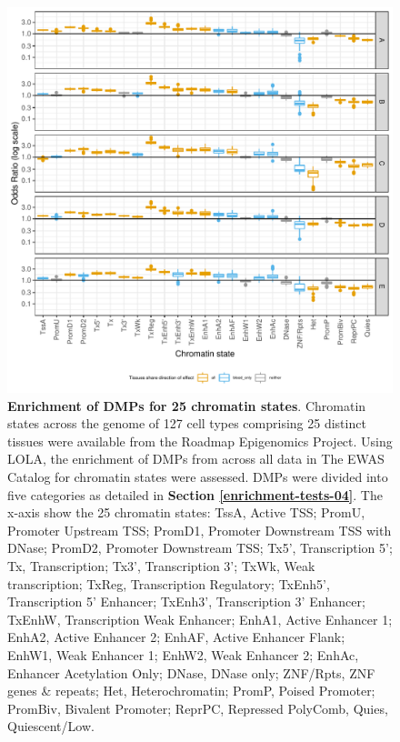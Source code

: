 \documentclass[11pt,oneside]{bristolthesis}
\begin{document}
\begin{figure}

{\centering \includegraphics[width=1\linewidth]{figure/04-properties_of_ewas/chromatin_states_enrichment_boxplots_onepage} 

}

\caption[Enrichment of DMPs for 25 chromatin states]{\textbf{Enrichment of DMPs for 25 chromatin states}. Chromatin states across the genome of 127 cell types comprising 25 distinct tissues were available from the Roadmap Epigenomics Project. Using LOLA, the enrichment of DMPs from across all data in The EWAS Catalog for chromatin states were assessed. DMPs were divided into five categories as detailed in \textbf{Section \ref{enrichment-tests-04}}. The x-axis show the 25 chromatin states: TssA, Active TSS; PromU, Promoter Upstream TSS; PromD1, Promoter Downstream TSS with DNase; PromD2, Promoter Downstream TSS; Tx5', Transcription 5'; Tx, Transcription; Tx3', Transcription 3'; TxWk, Weak transcription; TxReg, Transcription Regulatory; TxEnh5', Transcription 5' Enhancer; TxEnh3', Transcription 3' Enhancer; TxEnhW, Transcription Weak Enhancer; EnhA1, Active Enhancer 1; EnhA2, Active Enhancer 2; EnhAF, Active Enhancer Flank; EnhW1, Weak Enhancer 1; EnhW2, Weak Enhancer 2; EnhAc, Enhancer Acetylation Only; DNase, DNase only; ZNF/Rpts, ZNF genes \& repeats; Het, Heterochromatin; PromP, Poised Promoter; PromBiv, Bivalent Promoter; ReprPC, Repressed PolyComb, Quies, Quiescent/Low.}\label{fig:chrom-state-plot}
\end{figure}
\end{document}
